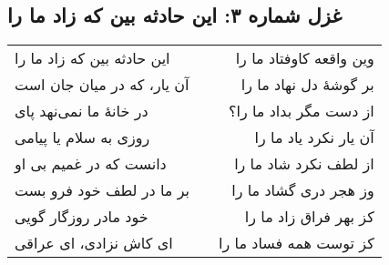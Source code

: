 \begin{center}
\section*{غزل شماره ۳: این حادثه بین که زاد ما را}
\label{sec:003}
\begin{longtable}{l p{0.5cm} r}
این حادثه بین که زاد ما را
&&
وین واقعه کاوفتاد ما را
\\
آن یار، که در میان جان است
&&
بر گوشهٔ دل نهاد ما را
\\
در خانهٔ ما نمی‌نهد پای
&&
از دست مگر بداد ما را؟
\\
روزی به سلام یا پیامی
&&
آن یار نکرد یاد ما را
\\
دانست که در غمیم بی او
&&
از لطف نکرد شاد ما را
\\
بر ما در لطف خود فرو بست
&&
وز هجر دری گشاد ما را
\\
خود مادر روزگار گویی
&&
کز بهر فراق زاد ما را
\\
ای کاش نزادی، ای عراقی
&&
کز توست همه فساد ما را
\\
\end{longtable}
\end{center}

